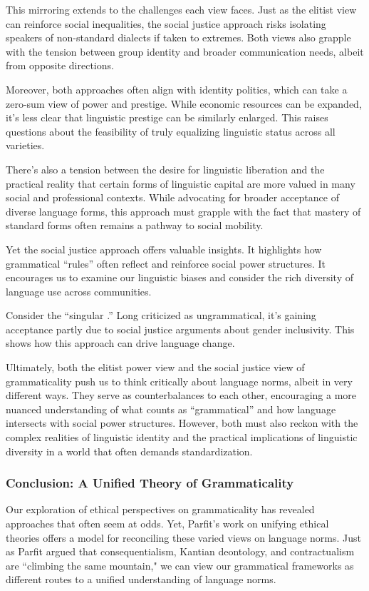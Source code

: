 This mirroring extends to the challenges each view faces. Just as the elitist view can reinforce social inequalities, the social justice approach risks isolating speakers of non-standard dialects if taken to extremes. Both views also grapple with the tension between group identity and broader communication needs, albeit from opposite directions.

Moreover, both approaches often align with identity politics, which can take a zero-sum view of power and prestige. While economic resources can be expanded, it's less clear that linguistic prestige can be similarly enlarged. This raises questions about the feasibility of truly equalizing linguistic status across all varieties.

There's also a tension between the desire for linguistic liberation and the practical reality that certain forms of linguistic capital are more valued in many social and professional contexts. While advocating for broader acceptance of diverse language forms, this approach must grapple with the fact that mastery of standard forms often remains a pathway to social mobility.

Yet the social justice approach offers valuable insights. It highlights how grammatical ``rules'' often reflect and reinforce social power structures. It encourages us to examine our linguistic biases and consider the rich diversity of language use across communities.

Consider the ``singular .'' Long criticized as ungrammatical, it's gaining acceptance partly due to social justice arguments about gender inclusivity. This shows how this approach can drive language change.

Ultimately, both the elitist power view and the social justice view of grammaticality push us to think critically about language norms, albeit in very different ways. They serve as counterbalances to each other, encouraging a more nuanced understanding of what counts as ``grammatical'' and how language intersects with social power structures. However, both must also reckon with the complex realities of linguistic identity and the practical implications of linguistic diversity in a world that often demands standardization.

\subsubsection{Conclusion: A Unified Theory of Grammaticality}

Our exploration of ethical perspectives on grammaticality has revealed approaches that often seem at odds. Yet, Parfit's work on unifying ethical theories offers a model for reconciling these varied views on language norms. Just as Parfit argued that consequentialism, Kantian deontology, and contractualism are ``climbing the same mountain," we can view our grammatical frameworks as different routes to a unified understanding of language norms.

